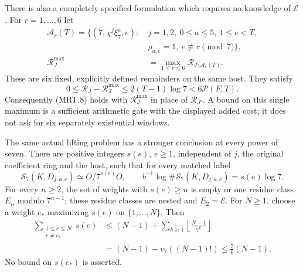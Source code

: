 \begin{theorem}
There is also a completely specified formulation which requires no
knowledge of $\mathscr E$.  For $r=1,\ldots,6$ let
\[
 \begin{split}
 \mathcal A_r(T)=\{(7,\chi^j\xi_7^a,e):\ &j=1,2,\ 0\leq a\leq5,
       \ 1\leq e<T,\\
       &\rho_{a,e}=1,\ e\not\equiv r\pmod7\},\\
 \mathcal R^{\max}_J&=\max_{1\leq r\leq6}
                       \mathcal R_{J\setminus\mathcal A_r(T)}.
 \end{split}                                                   \tag{MRT.24}
\]
These are six fixed, explicitly defined remainders on the same host.
They satisfy
\[
 0\leq\mathcal R_J-\mathcal R^{\max}_J
       \leq2(T-1)\log7<6\mathcal P(F,T).                       \tag{MRT.25}
\]
Consequently (MRT.8) holds with $\mathcal R^{\max}_J$ in place
of $\mathcal R_{J'}$.  A bound on this single maximum is a
sufficient arithmetic gate with the displayed added cost; it
does not ask for six separately existential windows.

The same actual lifting problem has a stronger conclusion at every
power of seven.  There are positive integers $s(e)$, $e\geq1$,
independent of $j$, the original coefficient ring and the host, such
that for every matched label
\[
 \mathcal S_7(K,D_{j,a,e})\simeq O/7^{s(e)}O,
 \qquad b^{-1}\log\#\mathcal S_7(K,D_{j,a,e})=s(e)\log7.
 \tag{MRT.27}
\]
For every $n\geq2$, the set of weights with $s(e)\geq n$ is
empty or one residue class $E_n$ modulo $7^{n-1}$; these residue
classes are nested and $E_2=\mathscr E$.
For $N\geq1$, choose a weight $e_*$ maximizing $s(e)$ on
$\{1,\ldots,N\}$.  Then
\[
 \begin{split}
 \sum_{\substack{1\leq e\leq N\\ e\ne e_*}}s(e)
 &\leq(N-1)+\sum_{k\geq1}\left\lfloor\frac{N-1}{7^k}\right\rfloor\\
 &=(N-1)+v_7((N-1)!)\leq\frac76(N-1).
 \end{split}
 \tag{MRT.28}
\]
No bound on $s(e_*)$ is asserted.


\end{theorem}
